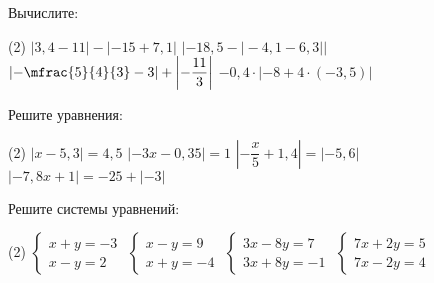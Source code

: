 \begin{homework}[number=3]
	\begin{listofex}
		\item Вычислите:
		\begin{tasks}(2)
			\task \( |3,4-11|-|-15+7,1| \)
			\task \( |-18,5-|-4,1-6,3|| \)
			\task \( \left| -\mfrac{5 }{4 }{3 } - 3 \right| + \left| -\dfrac{ 11 }{ 3 } \right| \)
			\task \( -0,4 \cdot |-8 + 4 \cdot (-3,5)| \)
		\end{tasks}
		\item Решите уравнения:
		\begin{tasks}(2)
			\task \( |x-5,3|=4,5 \)
			\task \( |-3x-0,35|=1 \)
			\task \( \left| -\dfrac{ x }{ 5 }+1,4 \right|=|-5,6| \)
			\task \( |-7,8x+1|=-25 + |-3| \)
		\end{tasks}
		\item Решите системы уравнений: %
		\begin{tasks}(2)
			\task \( \begin{cases} x+y=-3 \\ x-y=2 \end{cases} \)
			\task \( \begin{cases} x-y=9 \\ x+y=-4 \end{cases} \)
			\task \( \begin{cases} 3x-8y=7 \\ 3x+8y=-1 \end{cases} \)
			\task \( \begin{cases} 7x+2y=5 \\ 7x-2y=4 \end{cases} \)
		\end{tasks}
	\end{listofex}
\end{homework}

